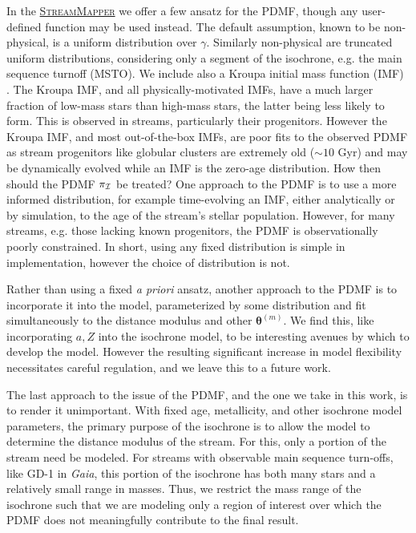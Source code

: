 \documentclass[twocolumn, linenumbers]{aastex631}
\newcommand{\code}[1]{\textsc{#1}}
\newcommand{\package}[1]{\code{#1}}
\newcommand{\stream}[1]{#1}
\newcommand{\dataarchive}[1]{\textit{#1}}
\newcommand{\Gaia}{\dataarchive{Gaia}}
\newcommand{\mbs}[1]{\boldsymbol{#1}}
\newcommand{\mcal}[1]{\mathcal{#1}}
\newcommand{\prior}{\mcal{\pi}}
\newcommand{\smallcomponent}[2]{#2^{\scriptscriptstyle (#1)}}
\newcommand{\cmp}[2]{\smallcomponent{#1}{#2}}
\begin{document}
            In the
            \href{https://github.com/GalOrrery/stream_mapper-pytorch}{\package{StreamMapper}}
            we offer a few ansatz for the PDMF, though any user-defined function
            may be used instead. The default assumption, known to be
            non-physical, is a uniform distribution over $\gamma$.  Similarly
            non-physical are truncated uniform distributions, considering only a
            segment of the isochrone, e.g. the main sequence turnoff (MSTO). We
            include also a Kroupa initial mass function (IMF)
            \citep{Kroupa2001}. The Kroupa IMF, and all physically-motivated
            IMFs, have a much larger fraction of low-mass stars than high-mass
            stars, the latter being less likely to form.  This is observed in
            streams, particularly their progenitors. However the Kroupa IMF, and
            most out-of-the-box IMFs, are poor fits to the observed PDMF as
            stream progenitors like globular clusters are extremely old
            ($\sim10$ Gyr) and may be dynamically evolved
            \citep{GrillmairSmith2001} while an IMF is the zero-age
            distribution.  How then should the PDMF $\prior_{\cal{I}}$ be
            treated?  One approach to the PDMF is to use a more informed
            distribution, for example time-evolving an IMF, either analytically
            or by simulation, to the age of the stream's stellar population.
            However, for many streams, e.g. those lacking known progenitors, the
            PDMF is observationally poorly constrained.  In short, using any
            fixed distribution is simple in implementation, however the choice
            of distribution is not.

            Rather than using a fixed \textit{a priori} ansatz, another approach
            to the PDMF is to incorporate it into the model, parameterized by
            some distribution and fit simultaneously to the distance modulus and
            other $\cmp{m}{\mbs{\theta}}$.  We find this, like incorporating $a,
            Z$ into the isochrone model, to be interesting avenues by which to
            develop the model. However the resulting significant increase in
            model flexibility necessitates careful regulation, and we leave this
            to a future work.

            The last approach to the issue of the PDMF, and the one we take in
            this work, is to render it unimportant.  With fixed age,
            metallicity, and other isochrone model parameters, the primary
            purpose of the isochrone is to allow the model to determine the
            distance modulus of the stream. For this, only a portion of the
            stream need be modeled.  For streams with observable main sequence
            turn-offs, like \stream{GD-1} in \Gaia, this portion of the
            isochrone has both many stars and a relatively small range in
            masses. Thus, we restrict the mass range of the isochrone such that
            we are modeling only a region of interest over which the PDMF does
            not meaningfully contribute to the final result.
\end{document}
